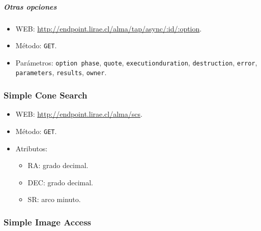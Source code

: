 \subparagraph{Otras opciones}

\begin{itemize}
	\item WEB: \url{http://endpoint.lirae.cl/alma/tap/async/:id/:option}.
	\item M\'etodo: \verb;GET;.
	\item Parámetros: \verb;option phase;, \verb;quote;, \verb;executionduration;, \verb;destruction;, \verb;error;, \verb;parameters;, \verb;results;, \verb;owner;.
\end{itemize}

\subsubsection*{{\sc Simple Cone Search}}

\begin{itemize}
	\item WEB: \url{http://endpoint.lirae.cl/alma/scs}.
	\item M\'etodo: \verb;GET;.
	\item Atributos: 
		\begin{itemize}
			\item RA: grado decimal.
			\item DEC: grado decimal.
			\item SR: arco minuto.
		\end{itemize}
\end{itemize}

\subsubsection*{{\sc Simple Image Access}}


